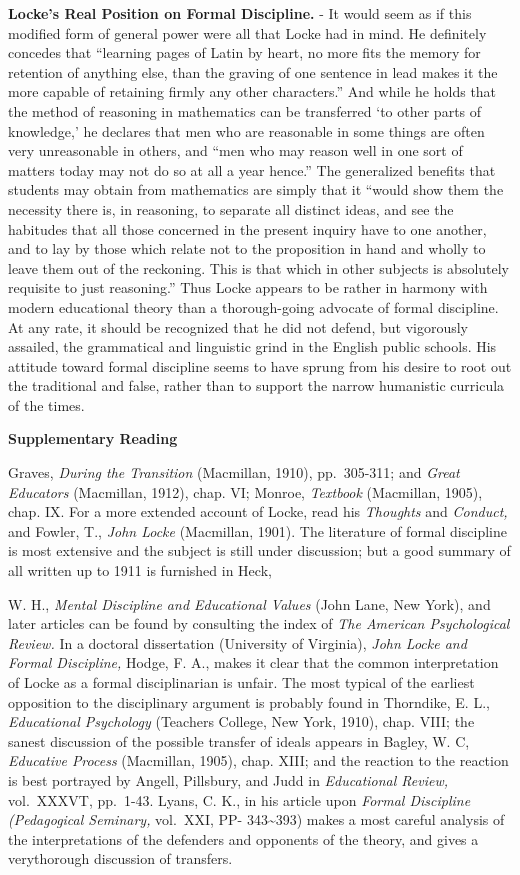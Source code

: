 \documentclass[]{book}
\begin{document}
\textbf{Locke's Real Position on Formal Discipline.} - It would seem as if this modified form of general power were all that Locke had in mind. He definitely concedes that ``learning pages of Latin by heart, no more fits the memory for retention of anything else, than the graving of one sentence in lead makes it the more capable of retaining firmly any other characters.'' And while he holds that the method of reasoning in mathematics can be transferred `to other parts of knowledge,' he declares that men who are reasonable in some things are often very unreasonable in others, and ``men who may reason well in one sort of matters today may not do so at all a year hence.'' The generalized benefits that students may obtain from mathematics are simply that it ``would show them the necessity there is, in reasoning, to separate all distinct ideas, and see the habitudes that all those concerned in the present inquiry have to one another, and to lay by those which relate not to the proposition in hand and wholly to leave them out of the reckoning. This is that which in other subjects is absolutely requisite to just reasoning.'' Thus Locke appears to be rather in harmony with modern educational theory than a thorough-going advocate of formal discipline. At any rate, it should be recognized that he did not defend, but vigorously assailed, the grammatical and linguistic grind in the English public schools. His attitude toward formal discipline seems to have sprung from his desire to root out the traditional and false, rather than to support the narrow humanistic curricula of the times.

\textbf{Supplementary Reading}

Graves, \emph{During the Transition} (Macmillan, 1910), pp.~305-311; and \emph{Great Educators} (Macmillan, 1912), chap. VI; Monroe, \emph{Textbook} (Macmillan, 1905), chap. IX. For a more extended account of Locke, read his \emph{Thoughts} and \emph{Conduct,} and Fowler, T., \emph{John Locke} (Macmillan, 1901). The literature of formal discipline is most extensive and the subject is still under discussion; but a good summary of all written up to 1911 is furnished in Heck,

W. H., \emph{Mental Discipline and Educational Values} (John Lane, New York), and later articles can be found by consulting the index of \emph{The American Psychological Review.} In a doctoral dissertation (University of Virginia), \emph{John Locke and Formal Discipline,} Hodge, F. A., makes it clear that the common interpretation of Locke as a formal disciplinarian is unfair. The most typical of the earliest opposition to the disciplinary argument is probably found in Thorndike, E. L., \emph{Educational Psychology} (Teachers College, New York, 1910), chap. VIII; the sanest discussion of the possible transfer of ideals appears in Bagley, W. C, \emph{Educative Process} (Macmillan, 1905), chap. XIII; and the reaction to the reaction is best portrayed by Angell, Pillsbury, and Judd in \emph{Educational Review,} vol.~XXXVT, pp.~1-43. Lyans, C. K., in his article upon \emph{Formal Discipline (Pedagogical Seminary,} vol.~XXI, PP- 343\textasciitilde{}393) makes a most careful analysis of the interpretations of the defenders and opponents of the theory, and gives a verythorough discussion of transfers.
\end{document}
